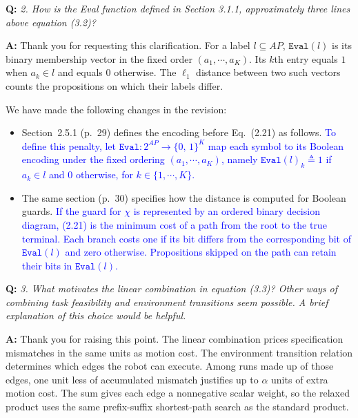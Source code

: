\documentclass[11pt]{article}
\newcommand{\change}[1]{\textcolor{blue}{#1}}
\begin{document}
\begin{shaded*}
\noindent\textbf{Q:} \emph{2. How is the Eval function defined in Section
3.1.1, approximately three lines above equation (3.2)?}
\end{shaded*}
\noindent\textbf{A:} Thank you for requesting this clarification. For a label $l\subseteq
AP$, $\texttt{Eval}(l)$ is its binary
membership vector in the fixed order $(a_1,\cdots,a_K)$. Its $k$th entry equals $1$
when $a_k\in l$ and equals $0$ otherwise. The $\ell_1$ distance between two such
vectors counts the propositions on which their labels differ.

We have made the following changes in the revision:
\begin{itemize}
\item Section~2.5.1 (p.~29) defines the encoding before Eq.~(2.21) as follows.
\change{To define this penalty, let
$\texttt{Eval} : 2^{AP} \rightarrow \{0,\, 1\}^{K}$ map each symbol to its
Boolean encoding under the fixed ordering $(a_1,\cdots,a_K)$, namely
$\texttt{Eval}(l)_k\triangleq 1$ if $a_k\in l$ and $0$ otherwise, for
$k\in\{1,\cdots,K\}$.}

\item The same section (p.~30) specifies how the distance is computed for Boolean guards.
\change{If the guard for $\chi$ is represented by an ordered binary decision
diagram, (2.21) is the minimum cost of a path from the root
to the true terminal. Each branch costs one if its bit differs from the
corresponding bit of $\texttt{Eval}(l)$ and zero otherwise. Propositions skipped
on the path can retain their bits in $\texttt{Eval}(l)$.}
\end{itemize}

\begin{shaded*}
\noindent\textbf{Q:} \emph{3. What motivates the linear combination in
equation (3.3)? Other ways of combining task feasibility and environment transitions seem
possible. A brief explanation of this choice would be helpful.}
\end{shaded*}
\noindent\textbf{A:} Thank you for raising this point. The linear combination prices
specification mismatches
in the same units as motion cost. The environment transition relation
determines which edges the robot can execute. Among runs made up of those edges,
one unit less of accumulated mismatch justifies up to $\alpha$ units of extra
motion cost. The sum gives each edge a nonnegative scalar weight, so the relaxed
product uses the same prefix-suffix shortest-path search as the standard product.
\end{document}
